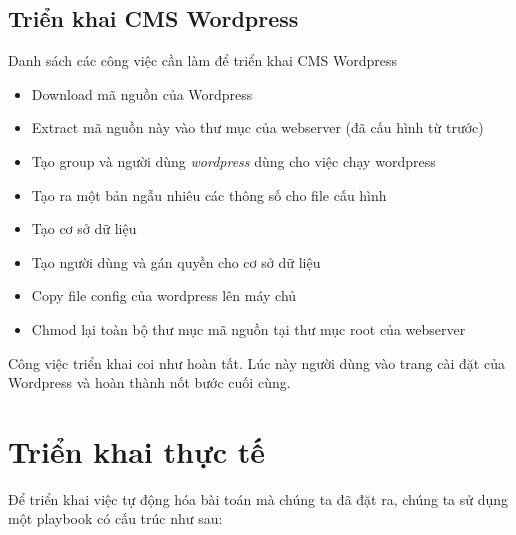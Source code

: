 \newpage
\clearpage

\subsection{Triển khai CMS Wordpress}
Danh sách các công việc cần làm để triển khai CMS Wordpress

\begin{itemize}
\item Download mã nguồn của Wordpress
\item Extract mã nguồn này vào thư mục của webserver (đã cấu hình từ trước)
\item Tạo group và người dùng \textit{wordpress} dùng cho việc chạy wordpress
\item Tạo ra một bản ngẫu nhiêu các thông số cho file cấu hình
\item Tạo cơ sở dữ liệu
\item Tạo người dùng và gán quyền cho cơ sở dữ liệu
\item Copy file config của wordpress lên máy chủ
\item Chmod lại toàn bộ thư mục mã nguồn tại thư mục root của webserver
\end{itemize}

Công việc triển khai coi như hoàn tất. Lúc này người dùng vào trang cài đặt của Wordpress và hoàn thành nốt bước cuối cùng.

\newpage
\clearpage

\section{Triển khai thực tế}

Để triển khai việc tự động hóa bài toán mà chúng ta đã đặt ra, chúng ta sử dụng một playbook có cấu trúc như sau:

